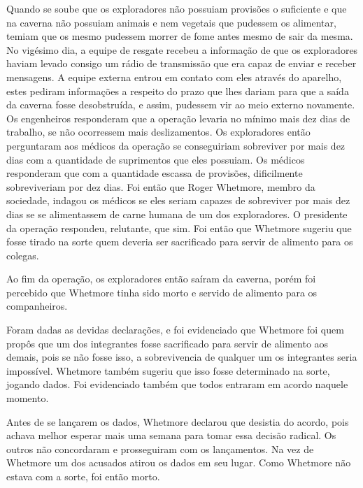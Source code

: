 \documentclass[12pt]{article}
\begin{document}
Quando se soube que os exploradores não possuiam provisões o suficiente e que na caverna não possuiam animais e nem vegetais que pudessem os alimentar, temiam que os mesmo pudessem morrer de fome antes mesmo de sair da mesma. No vigésimo dia, a equipe de resgate recebeu a informação de que os exploradores haviam levado consigo um rádio de transmissão que era capaz de enviar e receber mensagens. A equipe externa entrou em contato com eles através do aparelho, estes pediram informações a respeito do prazo que lhes dariam para que a saída da caverna fosse desobstruída, e assim, pudessem vir ao meio externo novamente. Os engenheiros responderam que a operação levaria no mínimo mais dez dias de trabalho, se não ocorressem mais deslizamentos. Os exploradores então perguntaram aos médicos da operação se conseguiriam sobreviver por mais dez dias com a quantidade de suprimentos que eles possuiam. Os médicos responderam que com a quantidade escassa de provisões, dificilmente sobreviveriam por dez dias. Foi então que Roger Whetmore, membro da sociedade, indagou os médicos se eles seriam capazes de sobreviver por mais dez dias se se alimentassem de carne humana de um dos exploradores. O presidente da operação respondeu, relutante, que sim. Foi então que Whetmore sugeriu que fosse tirado na sorte quem deveria ser sacrificado para servir de alimento para os colegas.

Ao fim da operação, os exploradores então saíram da caverna, porém foi percebido que Whetmore tinha sido morto e servido de alimento para os companheiros.

Foram dadas as devidas declarações, e foi evidenciado que Whetmore foi quem propôs que um dos integrantes fosse sacrificado para servir de alimento aos demais, pois se não fosse isso, a sobrevivencia de qualquer um os integrantes seria impossível. Whetmore também sugeriu que isso fosse determinado na sorte, jogando dados. Foi evidenciado também que todos entraram em acordo naquele momento.

Antes de se lançarem os dados, Whetmore declarou que desistia do acordo, pois achava melhor esperar mais uma semana para tomar essa decisão radical. Os outros não concordaram e prosseguiram com os lançamentos. Na vez de Whetmore um dos acusados atirou os dados em seu lugar. Como Whetmore não estava com a sorte, foi então morto.
\end{document}
